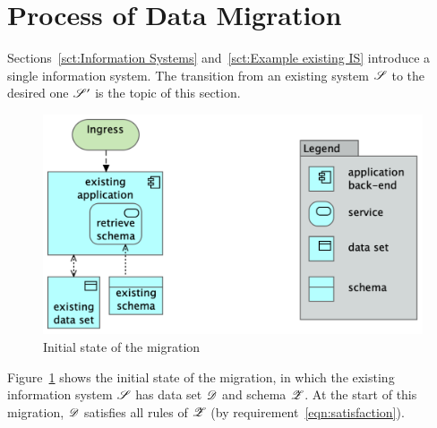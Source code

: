 \documentclass{elsarticle}
\begin{document}
\section{Process of Data Migration}
   Sections~\ref{sct:Information Systems} and~\ref{sct:Example existing IS} introduce a single information system.
   The transition from an existing system $\mathscr{S}$ to the desired one $\mathscr{S}'$ is the topic of this section.
\begin{figure}
   \centering
   \includegraphics[scale=0.09]{figures/Before migration.png}
   \caption{Initial state of the migration}
   \label{fig:initial}
\end{figure}
   Figure~\ref{fig:initial} shows the initial state of the migration,
   in which the existing information system $\mathscr{S}$ has data set $\mathscr{D}$ and schema $\mathscr{Z}$.
   At the start of this migration, $\mathscr{D}$ satisfies all rules of $\mathscr{Z}$ (by requirement~\ref{eqn:satisfaction}).
\end{document}

